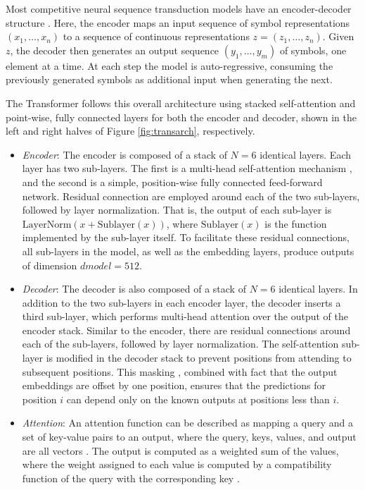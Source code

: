 Most competitive neural sequence transduction models have an encoder-decoder structure \cite{trans2}.
Here, the encoder maps an input sequence of symbol representations $(x_1, \ldots, x_n)$ to a sequence
of continuous representations $z = (z_1, \ldots, z_n)$. Given $z$, the decoder then generates an output
sequence $(y_1, \ldots, y_m)$ of symbols, one element at a time. At each step the model is auto-regressive, consuming the previously generated symbols as additional input when generating the next.

The Transformer follows this overall architecture using stacked self-attention and point-wise, fully
connected layers for both the encoder and decoder, shown in the left and right halves of Figure \ref{fig:transarch}, respectively.

\begin{itemize}
	\item \textit{Encoder}: The encoder is composed of a stack of $N = 6$
	      identical layers. Each layer has two
	      sub-layers. The first is a multi-head self-attention mechanism \cite{attention}, and the second is a simple, position-wise fully connected feed-forward network. Residual connection
	      are employed around each of
	      the two sub-layers, followed by layer normalization. That is, the output of each sub-layer is
	      $\text{LayerNorm}(x + \text{Sublayer}(x))$, where $\text{Sublayer}(x)$ is the function implemented by the sub-layer
	      itself. To facilitate these residual connections, all sub-layers in the model, as well as the embedding
	      layers, produce outputs of dimension $dmodel = 512$.

	\item \textit{Decoder}: The decoder is also composed of a stack of $N = 6$
	      identical layers. In addition to the two
	      sub-layers in each encoder layer, the decoder inserts a third sub-layer, which performs multi-head
	      attention over the output of the encoder stack. Similar to the encoder, there are residual connections
	      around each of the sub-layers, followed by layer normalization. The self-attention sub-layer is modified in the decoder stack to prevent positions from attending to subsequent positions. This
	      masking \cite{attention}, combined with fact that the output embeddings are offset by one position, ensures that the
	      predictions for position $i$ can depend only on the known outputs at positions less than $i$.

	\item \textit{Attention}: An attention \cite{attention} function can be described as
	      mapping a query and a set of key-value pairs to an output,
	      where the query, keys, values, and output are all vectors \cite{trans1}. The output is computed as a weighted sum of the values, where the weight assigned to each value is computed by a compatibility function of the
	      query with the corresponding key \cite{attention}.
\end{itemize}

